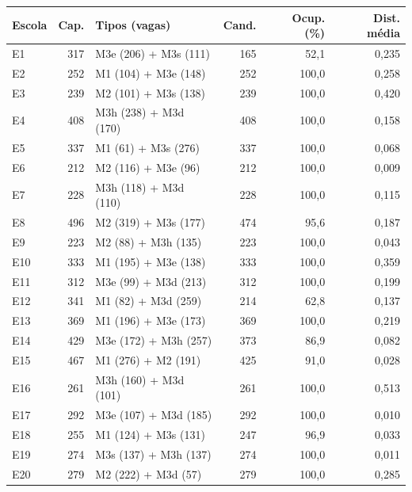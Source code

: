 \begin{tabular}{lrlrrr}
\hline
Escola & Cap. & Tipos (vagas) & Cand. & Ocup. (\%) & Dist. média \\
\hline
E1 & 317 & M3e (206) + M3s (111) & 165 & 52,1 & 0,235 \\
E2 & 252 & M1 (104) + M3e (148) & 252 & 100,0 & 0,258 \\
E3 & 239 & M2 (101) + M3s (138) & 239 & 100,0 & 0,420 \\
E4 & 408 & M3h (238) + M3d (170) & 408 & 100,0 & 0,158 \\
E5 & 337 & M1 (61) + M3s (276) & 337 & 100,0 & 0,068 \\
E6 & 212 & M2 (116) + M3e (96) & 212 & 100,0 & 0,009 \\
E7 & 228 & M3h (118) + M3d (110) & 228 & 100,0 & 0,115 \\
E8 & 496 & M2 (319) + M3s (177) & 474 & 95,6 & 0,187 \\
E9 & 223 & M2 (88) + M3h (135) & 223 & 100,0 & 0,043 \\
E10 & 333 & M1 (195) + M3e (138) & 333 & 100,0 & 0,359 \\
E11 & 312 & M3e (99) + M3d (213) & 312 & 100,0 & 0,199 \\
E12 & 341 & M1 (82) + M3d (259) & 214 & 62,8 & 0,137 \\
E13 & 369 & M1 (196) + M3e (173) & 369 & 100,0 & 0,219 \\
E14 & 429 & M3e (172) + M3h (257) & 373 & 86,9 & 0,082 \\
E15 & 467 & M1 (276) + M2 (191) & 425 & 91,0 & 0,028 \\
E16 & 261 & M3h (160) + M3d (101) & 261 & 100,0 & 0,513 \\
E17 & 292 & M3e (107) + M3d (185) & 292 & 100,0 & 0,010 \\
E18 & 255 & M1 (124) + M3s (131) & 247 & 96,9 & 0,033 \\
E19 & 274 & M3s (137) + M3h (137) & 274 & 100,0 & 0,011 \\
E20 & 279 & M2 (222) + M3d (57) & 279 & 100,0 & 0,285 \\
\hline
\end{tabular}
